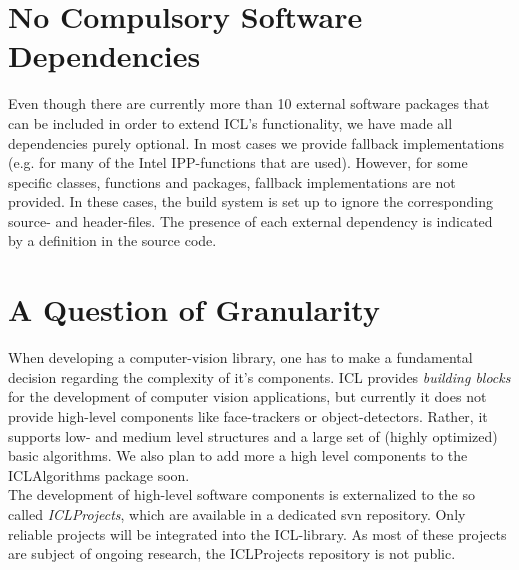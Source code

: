  
\section{No Compulsory Software Dependencies}
Even though there are currently more than 10 external software packages that can be included in order to extend ICL's functionality, we have made all dependencies purely optional. In most cases we provide fallback implementations (e.g. for many of the Intel IPP-functions that are used). However, for some specific classes, functions and packages, fallback implementations are not provided. In these cases, the build system is set up to ignore the corresponding source- and header-files. The presence of each external dependency  is indicated by a  definition in the source code. 

\section{A Question of Granularity}
When developing a computer-vision library, one has to make a fundamental decision regarding the complexity of it's components. ICL provides \emph{building blocks} for the development of computer vision applications, but currently it does not provide high-level components like face-trackers or object-detectors. Rather, it supports low- and medium level structures and a large set of (highly optimized) basic algorithms.
We also plan to add more a high level components to the ICLAlgorithms package soon.\\
The development of high-level software components is externalized to the so called \emph{ICLProjects}, which are available in a dedicated svn repository. Only reliable projects will be integrated into the ICL-library. As most of these projects are subject of ongoing research, the ICLProjects repository is not public.


